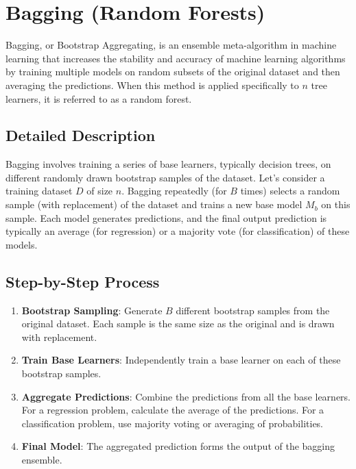 \documentclass[12pt]{article}
\begin{document}
\section{Bagging (Random Forests)}

Bagging, or Bootstrap Aggregating, is an ensemble meta-algorithm in machine learning that increases the stability and accuracy of machine learning algorithms by training multiple models on random subsets of the original dataset and then averaging the predictions. When this method is applied specifically to \(n\) tree learners, it is referred to as a random forest.

\subsection{Detailed Description}

Bagging involves training a series of base learners, typically decision trees, on different randomly drawn bootstrap samples of the dataset. Let's consider a training dataset \(D\) of size \(n\). Bagging repeatedly (for \(B\) times) selects a random sample (with replacement) of the dataset and trains a new base model \(M_b\) on this sample. Each model generates predictions, and the final output prediction is typically an average (for regression) or a majority vote (for classification) of these models.

\subsection{Step-by-Step Process}

\begin{enumerate}
    \item \textbf{Bootstrap Sampling}: Generate \(B\) different bootstrap samples from the original dataset. Each sample is the same size as the original and is drawn with replacement.
    \item \textbf{Train Base Learners}: Independently train a base learner on each of these bootstrap samples.
    \item \textbf{Aggregate Predictions}: Combine the predictions from all the base learners. For a regression problem, calculate the average of the predictions. For a classification problem, use majority voting or averaging of probabilities.
    \item \textbf{Final Model}: The aggregated prediction forms the output of the bagging ensemble.
\end{enumerate}
\end{document}
